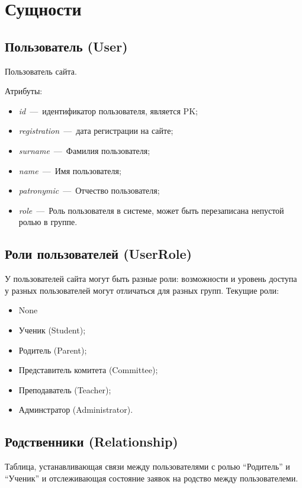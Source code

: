 \documentclass[14pt]{article}
\begin{document}
\section{Сущности}

\subsection{Пользователь (User)}

Пользователь сайта. 

Атрибуты:

\begin{itemize}
	\item \emph{id}~---~идентификатор пользователя, является PK;
	\item \emph{registration}~---~дата регистрации на сайте;
	\item \emph{surname}~---~Фамилия пользователя;
	\item \emph{name}~---~Имя пользователя;
	\item \emph{patronymic}~---~Отчество пользователя;
    \item \emph{role}~---~Роль пользователя в системе, может быть перезаписана непустой ролью в группе.
\end{itemize}

\subsection{Роли пользователей (UserRole)}

У пользователей сайта могут быть разные роли: возможности и уровень доступа у разных пользователей могут отличаться для разных групп.
Текущие роли:
\begin{itemize}
    \item None
	\item Ученик (Student);
	\item Родитель (Parent);
	\item Представитель комитета (Committee);
	\item Преподаватель (Teacher);
	\item Админстратор (Administrator).
\end{itemize}

\subsection{Родственники (Relationship)}

Таблица, устанавливающая связи между пользователями с ролью ``Родитель'' и ``Ученик'' и отслеживающая состояние заявок на родство между пользователеми.
\end{document}
